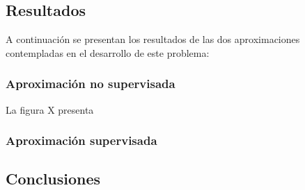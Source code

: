 \subsection{Resultados}
A continuación se presentan los resultados de las dos aproximaciones contempladas en el desarrollo de este problema:

\subsubsection{Aproximación no supervisada}
La figura X presenta 



\subsubsection{Aproximación supervisada}


\subsection{Conclusiones}